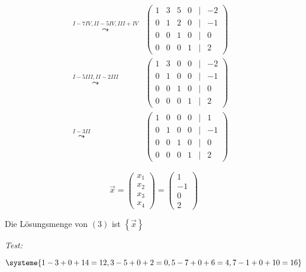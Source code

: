 \documentclass[a4paper,12pt]{article}
\begin{document}
\[\begin{aligned}
        \overset{I-7IV,II-5IV,III+IV}\leadsto                                    & \begin{pmatrix}1&3&5&0&|&-2\\0&1&2&0&|&-1\\0&0&1&0&|&0\\0&0&0&1&|&2\end{pmatrix}                       \\
        \overset{I-5III,II-2III}\leadsto                                         & \begin{pmatrix}1&3&0&0&|&-2\\0&1&0&0&|&-1\\0&0&1&0&|&0\\0&0&0&1&|&2\end{pmatrix}                       \\
        \overset{I-3II}\leadsto                                                  & \begin{pmatrix}1&0&0&0&|&1\\0&1&0&0&|&-1\\0&0&1&0&|&0\\0&0&0&1&|&2\end{pmatrix}                      &
    \end{aligned}
\]

\[
    \vec{x}=\begin{pmatrix}
        x_1 \\x_2\\x_3\\x_4
    \end{pmatrix}=\begin{pmatrix}
        1 \\-1\\0\\2
    \end{pmatrix}
\]

Die Lösungsmenge von $(3)$ ist $\left\{\vec{x}\right\}$

\emph{Test: }

\[
    \systeme{
        1-3+0+14=12,
        3-5+0+2=0,
        5-7+0+6=4,
        7-1+0+10=16
    }
\]

\clearpage
\end{document}
